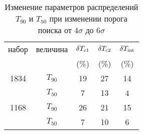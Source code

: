\begin{table} [h]
 \centering
 \caption{Изменение параметров распределений $T_{90}$ и $T_{50}$ при изменении порога поиска от $4\sigma$ до $6\sigma$}
 \label{tab:Txx_vs_thd}
\scriptsize
  \begin{center}
  \begin{tabular}{c c c c c}
  \hline
  \hline
набор & величина & $\delta T_{\mathrm{c1}}$ & $\delta T_{\mathrm{c2}}$ & $\delta T_{\mathrm{int}}$ \\
      &          &         (\%)        &   (\%)              &  (\%)            \\       
    
\hline
1834  &  $T_{90}$ &  19  & 27 &  14 \\ 
      &  $T_{50}$ &  7   & 13 &  4  \\ 
1168  &  $T_{90}$ &  26  & 21 &  15 \\ 
      &  $T_{50}$ &  7   & 10 &  6  \\
\hline
\end{tabular}
\end{center}
\end{table}